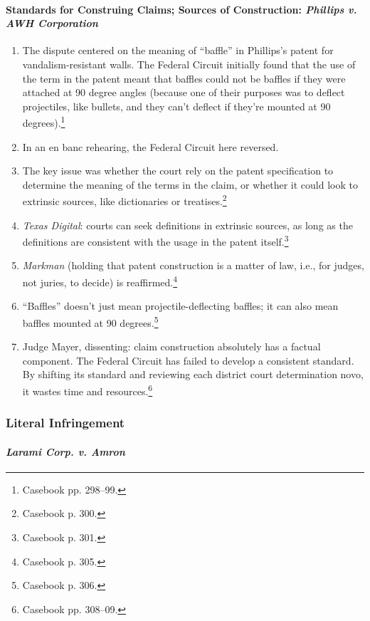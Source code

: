 \paragraph{Standards for Construing Claims; Sources of Construction: 
\emph{Phillips v. AWH Corporation}}

\begin{enumerate}
    \item The dispute centered on the meaning of ``baffle'' in Phillips's 
    patent for vandalism-resistant walls. The Federal Circuit initially found 
    that the use of the term in the patent meant that baffles could not be 
    baffles if they were attached at 90 degree angles (because one of their 
    purposes was to deflect projectiles, like bullets, and they can't deflect if 
    they're mounted at 90 degrees).\footnote{Casebook pp. 298--99.}
    \item In an en banc rehearing, the Federal Circuit here reversed.
    \item The key issue was whether the court rely on the patent specification 
    to determine the meaning of the terms in the claim, or whether it could look 
    to extrinsic sources, like dictionaries or treatises.\footnote{Casebook p. 
    300.}
    \item \emph{Texas Digital}: courts can seek definitions in extrinsic 
    sources, as long as the definitions are consistent with the usage in the 
    patent itself.\footnote{Casebook p. 301.}
    \item \emph{Markman} (holding that patent construction is a matter of law, 
    i.e., for judges, not juries, to decide) is reaffirmed.\footnote{Casebook p. 
    305.}
    \item ``Baffles'' doesn't just mean projectile-deflecting baffles; it can 
    also mean baffles mounted at 90 degrees.\footnote{Casebook p. 306.}
    \item Judge Mayer, dissenting: claim construction absolutely has a factual 
    component. The Federal Circuit has failed to develop a consistent standard. 
    By shifting its standard and reviewing each district court determination 
    novo, it wastes time and resources.\footnote{Casebook pp. 308--09.}
\end{enumerate}

\subsubsection{Literal Infringement}

\paragraph{\emph{Larami Corp. v. Amron}}

